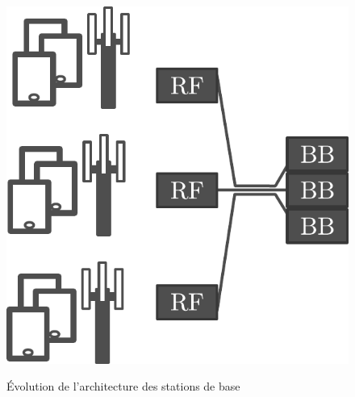 \begin{figure}[t]
{  \includegraphics[scale=0.5]{main/ch2_fig/bs2}
  \label{fig:bbu}
  }
  \quad\quad
  \caption{\'Evolution de l'architecture des stations de base}
  \label{fig:bs_evo}
\end{figure}

